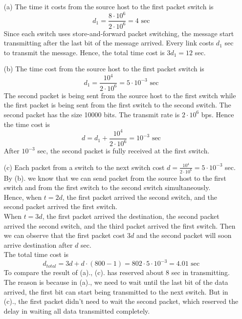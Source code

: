 \documentclass[12pt,a4paper]{article}
\begin{document}
\begin{enumerate}
    \item [(a)] 
        The time it costs from the source host to the first packet switch is
        \[
            d_{1} = \frac{8\cdot 10^{6}}{2\cdot 10^{6}} = 4 \text{ sec}
        \]
        Since each switch uses store-and-forward packet switching, the message start transmitting after the last bit of the message arrived.
        Every link costs $d_{1}$ sec to transmit the message.
        Hence, the total time cost is $3d_{1} = 12$ sec.
    \item[(b)]
        The time cost from the source host to the first packet switch is 
        \[
            d_{1} = \frac{10^{4}}{2\cdot 10^{6}} = 5\cdot 10^{-3} \text{ sec}
        \]
        The second packet is being sent from the source host to the first switch while the first packet is being sent from the first switch to the second switch.
        The second packet has the size 10000 bits. The transmit rate is $2\cdot 10^{6}$ bps.
        Hence the time cost is
        \[
            d = d_{1} + \frac{10^{4}}{2\cdot 10^{6}} = 10^{-3} \text{ sec}
        \]
        After $10^{-3}$ sec, the second packet is fully received at the first switch.
    \item[(c)]
        Each packet from a switch to the next switch cost $d = \frac{10^{4}}{2\cdot 10^{6}} = 5\cdot 10^{-3}$ sec.
        By (b). we know that we can send packet from the source host to the first switch and from the first switch to the second switch simultaneously.
        \\
        Hence, when $t = 2d$, the first packet arrived the second switch, and the second packet arrived the first switch.
        \\
        When $t = 3d$, the first packet arrived the destination, the second packet arrived the second switch, and the third packet arrived the first switch.
        Then we can observe that the first packet cost $3d$ and the second packet will soon arrive destination after $d$ sec.
        \\
        The total time cost is 
        \[
            d_{total} = 3d + d\cdot(800-1) = 802\cdot 5\cdot 10^{-3} = 4.01 \text{ sec}
        \]
        To compare the result of (a)., (c). has reserved about 8 sec in transmitting. The reason is because in (a)., we need to wait until the last bit of the data arrived, the first bit can start being transmitted to the next switch.
        But in (c)., the first packet didn't need to wait the second packet, which reserved the delay in waiting all data transmitted completely.

\end{enumerate}
\end{document}
